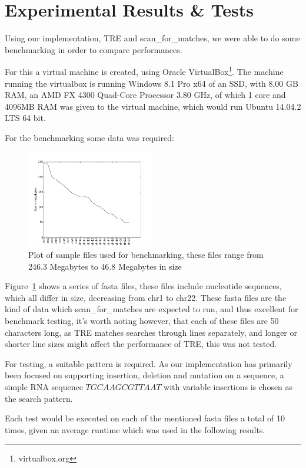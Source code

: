 \section{Experimental Results \& Tests}
Using our implementation, TRE and scan\_for\_matches, we were able to do some benchmarking in order to compare performances.

For this a virtual machine is created, using Oracle VirtualBox\footnote{virtualbox.org}. The machine running the virtualbox is running Windows 8.1 Pro x64 of an SSD, with 8,00 GB RAM, an AMD FX 4300 Quad-Core Processor 3.80 GHz, of which 1 core and 4096MB RAM was given to the virtual machine, which would run Ubuntu 14.04.2 LTS 64 bit.

For the benchmarking some data was required:
\begin{figure}[h!]
\centering
\includegraphics[width=0.5\textwidth]{Benchmarking/size.png}
\caption{Plot of sample files used for benchmarking, these files range from 246.3 Megabytes to 46.8 Megabytes in size}
\label{fig:size}
\end{figure}


Figure~\ref{fig:size} shows a series of fasta files, these files include nucleotide sequences, which all differ in size, decreasing from chr1 to chr22. These fasta files are the  kind of data which scan\_for\_matches are expected to run, and thus excellent for benchmark testing, it's worth noting however, that each of these files are 50 characters long, as TRE matches searches through lines separately, and longer or shorter line sizes might affect the performance of TRE, this was not tested.

For testing, a suitable pattern is required. As our implementation has primarily been focused on supporting insertion, deletion and mutation on a sequence, a simple RNA sequence $TGCAAGCGTTAAT$ with variable insertions is chosen as the search pattern.

Each test would be executed on each of the mentioned fasta files a total of 10 times, given an average runtime which was used in the following results.

